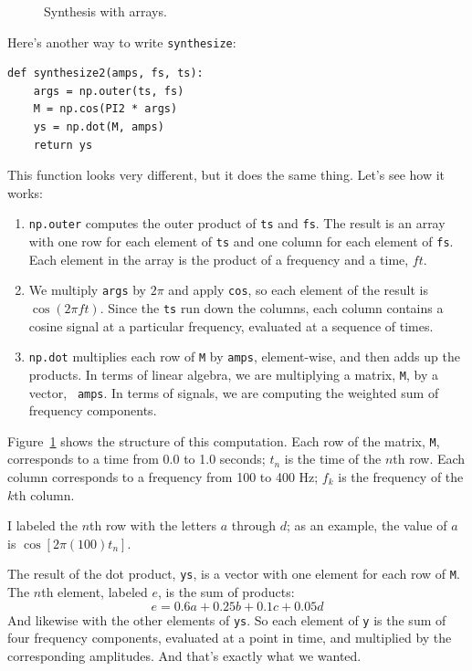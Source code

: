 \documentclass[12pt]{book}
\begin{document}
\begin{figure}

\caption{Synthesis with arrays.}
\label{fig.synthesis}
\end{figure}

Here's another way to write {\tt synthesize}:

\begin{verbatim}
def synthesize2(amps, fs, ts):
    args = np.outer(ts, fs)
    M = np.cos(PI2 * args)
    ys = np.dot(M, amps)
    return ys
\end{verbatim}

This function looks very different, but it does the same thing.
Let's see how it works:

\begin{enumerate}

\item {\tt np.outer} computes the outer product of {\tt ts} and
  {\tt fs}.  The result is an array with one row for each element
  of {\tt ts} and one column for each element of {\tt fs}.  Each
  element in the array is the product of a frequency and a time, $f
  t$.

\item We multiply {\tt args} by $2 \pi$ and apply {\tt cos}, so each
  element of the result is $\cos (2 \pi f t)$.  Since the {\tt ts} run
  down the columns, each column contains a cosine signal at a
  particular frequency, evaluated at a sequence of times.

\item {\tt np.dot} multiplies each row of {\tt M} by {\tt amps},
  element-wise, and then adds up the products.  In terms of linear
  algebra, we are multiplying a matrix, {\tt M}, by a vector, {\tt
    amps}.  In terms of signals, we are computing the weighted sum
  of frequency components.

\end{enumerate}

Figure~\ref{fig.synthesis} shows the structure of this computation.
Each row of the matrix, {\tt M}, corresponds to a time 
from 0.0 to 1.0 seconds; $t_n$ is the time of the $n$th row.
Each column corresponds to a frequency from
100 to 400 Hz; $f_k$ is the frequency of the $k$th column.

I labeled the $n$th row with the letters $a$ through $d$; as an
example, the value of $a$ is $\cos [2 \pi (100) t_n]$.

The result of the dot product, {\tt ys}, is a vector with one element
for each row of {\tt M}.  The $n$th element, labeled $e$, is the sum
of products:
%
\[ e = 0.6 a + 0.25 b + 0.1 c + 0.05 d \]
%
And likewise with the other elements of {\tt ys}.  So each element
of {\tt y} is the sum of four frequency components, evaluated at
a point in time, and multiplied by the corresponding amplitudes.
And that's exactly what we wanted.
\end{document}

